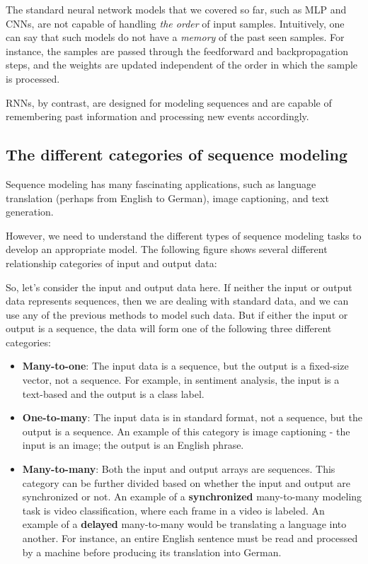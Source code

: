 \documentclass[11pt]{article}
\providecommand{\tightlist}{%
      \setlength{\itemsep}{0pt}\setlength{\parskip}{0pt}}
\begin{document}
    The standard neural network models that we covered so far, such as MLP
and CNNs, are not capable of handling \emph{the order} of input samples.
Intuitively, one can say that such models do not have a \emph{memory} of
the past seen samples. For instance, the samples are passed through the
feedforward and backpropagation steps, and the weights are updated
independent of the order in which the sample is processed.

RNNs, by contrast, are designed for modeling sequences and are capable
of remembering past information and processing new events accordingly.

    \subsection{The different categories of sequence
modeling}\label{the-different-categories-of-sequence-modeling}

    Sequence modeling has many fascinating applications, such as language
translation (perhaps from English to German), image captioning, and text
generation.

However, we need to understand the different types of sequence modeling
tasks to develop an appropriate model. The following figure shows
several different relationship categories of input and output data:

    So, let's consider the input and output data here. If neither the input
or output data represents sequences, then we are dealing with standard
data, and we can use any of the previous methods to model such data. But
if either the input or output is a sequence, the data will form one of
the following three different categories:

\begin{itemize}
\tightlist
\item
  \textbf{Many-to-one}: The input data is a sequence, but the output is
  a fixed-size vector, not a sequence. For example, in sentiment
  analysis, the input is a text-based and the output is a class label.
\item
  \textbf{One-to-many}: The input data is in standard format, not a
  sequence, but the output is a sequence. An example of this category is
  image captioning - the input is an image; the output is an English
  phrase.
\item
  \textbf{Many-to-many}: Both the input and output arrays are sequences.
  This category can be further divided based on whether the input and
  output are synchronized or not. An example of a \textbf{synchronized}
  many-to-many modeling task is video classification, where each frame
  in a video is labeled. An example of a \textbf{delayed} many-to-many
  would be translating a language into another. For instance, an entire
  English sentence must be read and processed by a machine before
  producing its translation into German.
\end{itemize}
\end{document}
